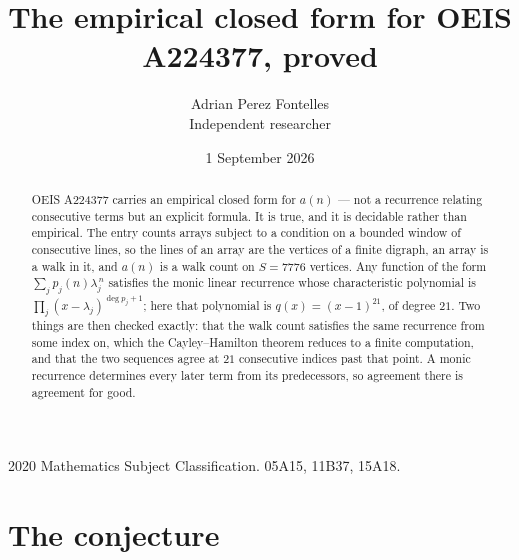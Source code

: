 \documentclass[11pt,a4paper]{article}
\title{The empirical closed form for OEIS A224377, proved}
\author{Adrian Perez Fontelles\\ \small Independent researcher}
\date{1 September 2026}
\theoremstyle{plain}
\theoremstyle{definition}
\begin{document}
\maketitle

\begin{abstract}
OEIS A224377 carries an empirical closed form for $a(n)$ --- not a recurrence relating
consecutive terms but an explicit formula. It is true, and it is decidable rather than
empirical. The entry counts arrays subject to a condition on a bounded window of consecutive lines, so the lines of an array are the
vertices of a finite digraph, an array is a walk in it, and $a(n)$ is a walk count on
$S=7776$ vertices. Any function of the form $\sum_j p_j(n)\lambda_j^{\,n}$ satisfies the
monic linear recurrence whose characteristic polynomial is
$\prod_j(x-\lambda_j)^{\deg p_j+1}$; here that polynomial is $q(x)=(x-1)^{21}$, of degree
$21$. Two things are then checked exactly: that the walk count satisfies the same
recurrence from some index on, which the Cayley--Hamilton theorem reduces to a finite
computation, and that the two sequences agree at $21$ consecutive indices past that
point. A monic recurrence determines every later term from its predecessors, so agreement
there is agreement for good.
\end{abstract}

\noindent\small 2020 Mathematics Subject Classification. 05A15, 11B37, 15A18.\normalsize

\section{The conjecture}
\end{document}
